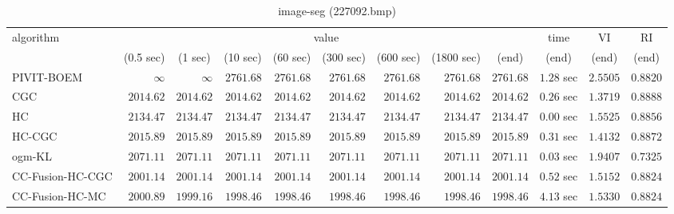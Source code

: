 \begin{table}[H]
\scriptsize
\centering
\caption{image-seg (227092.bmp)}
\label{tab:anytimetable-image-seg-227092.bmp}
\begin{tabular}{lrrrrrrrrrrr}
\toprule
           algorithm &                                   \multicolumn{8}{c}{value} & \multicolumn{1}{c}{time}    & \multicolumn{1}{c}{VI}  & \multicolumn{1}{c}{RI} \\  
\cmidrule(lr){2-9}\cmidrule(lr){10-10} \cmidrule(lr){11-11} \cmidrule(lr){12-12}   
                     & \multicolumn{1}{c}{(0.5 sec)} & \multicolumn{1}{c}{(1 sec)} & \multicolumn{1}{c}{(10 sec)} & \multicolumn{1}{c}{(60 sec)} & \multicolumn{1}{c}{(300 sec)} & \multicolumn{1}{c}{(600 sec)} & \multicolumn{1}{c}{(1800 sec)} & \multicolumn{1}{c}{(end)} & \multicolumn{1}{c}{(end)}    & \multicolumn{1}{c}{(end)}   & \multicolumn{1}{c}{(end)}  \\ \midrule 
          PIVIT-BOEM & $\infty$ & $\infty$ & $      2761.68$ & $      2761.68$ & $      2761.68$ & $      2761.68$ & $      2761.68$ & $      2761.68$ & $         1.28$ sec    & $       2.5505$  & $       0.8820$ \\ 
                 CGC & $      2014.62$ & $      2014.62$ & $      2014.62$ & $      2014.62$ & $      2014.62$ & $      2014.62$ & $      2014.62$ & $      2014.62$ & $         0.26$ sec    & $       1.3719$  & $       0.8888$ \\ 
                  HC & $      2134.47$ & $      2134.47$ & $      2134.47$ & $      2134.47$ & $      2134.47$ & $      2134.47$ & $      2134.47$ & $      2134.47$ & $         0.00$ sec    & $       1.5525$  & $       0.8856$ \\ 
              HC-CGC & $      2015.89$ & $      2015.89$ & $      2015.89$ & $      2015.89$ & $      2015.89$ & $      2015.89$ & $      2015.89$ & $      2015.89$ & $         0.31$ sec    & $       1.4132$  & $       0.8872$ \\ 
              ogm-KL & $      2071.11$ & $      2071.11$ & $      2071.11$ & $      2071.11$ & $      2071.11$ & $      2071.11$ & $      2071.11$ & $      2071.11$ & $         0.03$ sec    & $       1.9407$  & $       0.7325$ \\ 
    CC-Fusion-HC-CGC & $      2001.14$ & $      2001.14$ & $      2001.14$ & $      2001.14$ & $      2001.14$ & $      2001.14$ & $      2001.14$ & $      2001.14$ & $         0.52$ sec    & $       1.5152$  & $       0.8824$ \\ 
     CC-Fusion-HC-MC & $      2000.89$ & $      1999.16$ & $      1998.46$ & $      1998.46$ & $      1998.46$ & $      1998.46$ & $      1998.46$ & $      1998.46$ & $         4.13$ sec    & $       1.5330$  & $       0.8824$ \\ 

\end{tabular}
\end{table}
